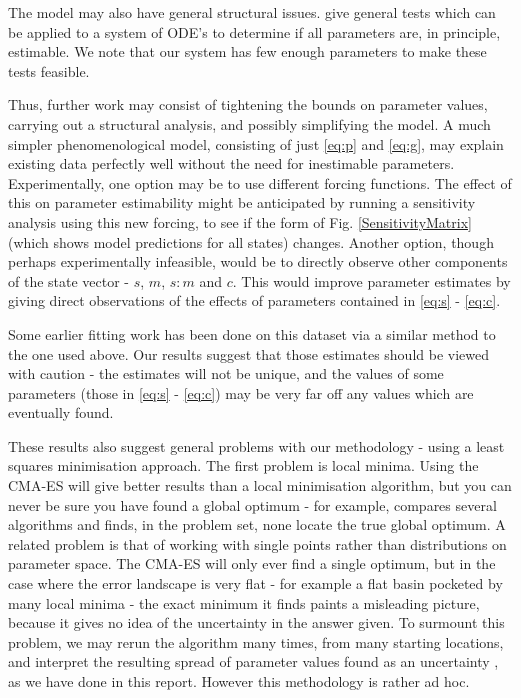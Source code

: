 \documentclass[10pt,journal]{./IEEE_latex_class/IEEEtran}
\begin{document}
 The model may also have general structural issues. \cite{Mclean2012, Grewal1976} give general tests which can be applied to a system of ODE's to determine if all parameters are, in principle, estimable. We note that our system has few enough parameters to make these tests feasible.
 
 Thus, further work may consist of tightening the bounds on parameter values, carrying out a structural analysis, and possibly simplifying the model. A much simpler phenomenological model, consisting of  just \eqref{eq:p} and \eqref{eq:g}, may explain existing data perfectly well without the need for inestimable parameters. Experimentally, one option  may be to use different forcing functions. The effect of this on parameter estimability might be anticipated by running a sensitivity analysis using this new forcing, to see if the form of Fig. \ref{SensitivityMatrix} (which shows model predictions for all states) changes. Another option, though perhaps experimentally infeasible, would be to directly observe other components of the state vector - $s$, $m$, $s:m$ and $c$. This would improve parameter estimates by giving direct observations of the effects of parameters contained in \eqref{eq:s} - \eqref{eq:c}.

Some earlier fitting work has been done on this dataset via a similar method to the one used above. Our results suggest that those estimates should be viewed with caution - the estimates will not be unique, and the values of some parameters (those in \eqref{eq:s} - \eqref{eq:c}) may be very far off any values which are eventually found.

These results also suggest general problems with our methodology - using a least squares minimisation approach. The first problem is local minima. Using the CMA-ES will give better results than a local minimisation algorithm, but you can never be sure you have found a global optimum - for example, \cite{Algorithms2003} compares several algorithms and finds, in the problem set, none locate the true global optimum. A related problem is that of working with single points rather than distributions on parameter space. The CMA-ES will only ever find a single optimum, but in the case where the error landscape is very flat -  for example a flat basin pocketed by many local minima - the exact minimum it finds paints a misleading picture, because it gives no idea of the uncertainty in the answer given. To surmount this problem, we may rerun the algorithm many times, from many starting locations, and interpret the resulting spread of parameter values found as an uncertainty \cite{Hu2015}, as we have done in this report. However this methodology is rather ad hoc.
\end{document}
